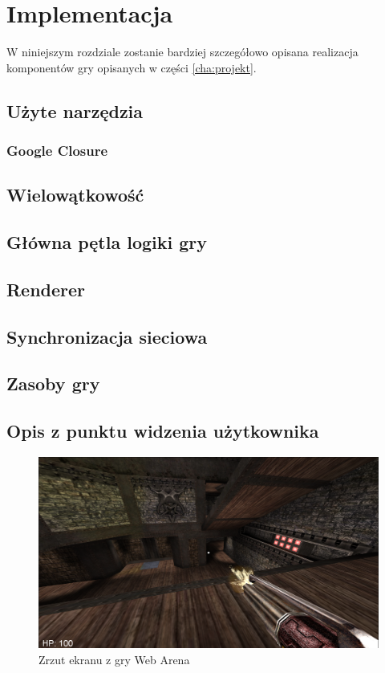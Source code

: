 \chapter{Implementacja}
\label{cha:implementacja}

W niniejszym rozdziale zostanie bardziej szczegółowo opisana realizacja komponentów
gry opisanych w części \ref{cha:projekt}.

\section{Użyte narzędzia}
\label{sec:uzyteNarzedzia}

\subsection{Google Closure}
\label{ssec:googleClosure}

\section{Wielowątkowość}
\label{sec:wielowatkowosc}

\section{Główna pętla logiki gry}
\label{sec:logikaGry}

\section{Renderer}
\label{sec:renderer}

\section{Synchronizacja sieciowa}
\label{sec:synchronizacjaSieciowa}

\section{Zasoby gry}
\label{sec:zasobyGry}

\section{Opis z punktu widzenia użytkownika}

\begin{figure}[h]
  \centering
  \includegraphics[scale=0.4]{zasoby/rozdzial31/screen}  
  \caption{Zrzut ekranu z gry Web Arena}
  \label{fig:screen}
\end{figure}


